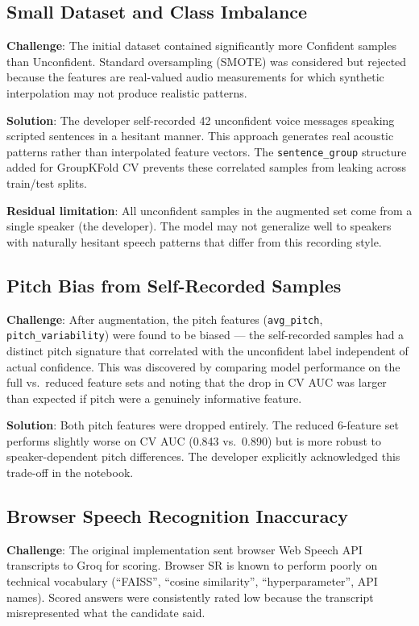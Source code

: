 \documentclass[12pt,a4paper]{article}
\begin{document}
\subsection{Small Dataset and Class Imbalance}

\textbf{Challenge}: The initial dataset contained significantly more Confident samples than Unconfident. Standard oversampling (SMOTE) was considered but rejected because the features are real-valued audio measurements for which synthetic interpolation may not produce realistic patterns.

\textbf{Solution}: The developer self-recorded 42 unconfident voice messages speaking scripted sentences in a hesitant manner. This approach generates real acoustic patterns rather than interpolated feature vectors. The \texttt{sentence\_group} structure added for GroupKFold CV prevents these correlated samples from leaking across train/test splits.

\textbf{Residual limitation}: All unconfident samples in the augmented set come from a single speaker (the developer). The model may not generalize well to speakers with naturally hesitant speech patterns that differ from this recording style.

\subsection{Pitch Bias from Self-Recorded Samples}

\textbf{Challenge}: After augmentation, the pitch features (\texttt{avg\_pitch}, \texttt{pitch\_variability}) were found to be biased --- the self-recorded samples had a distinct pitch signature that correlated with the unconfident label independent of actual confidence. This was discovered by comparing model performance on the full vs.\ reduced feature sets and noting that the drop in CV AUC was larger than expected if pitch were a genuinely informative feature.

\textbf{Solution}: Both pitch features were dropped entirely. The reduced 6-feature set performs slightly worse on CV AUC (0.843 vs.\ 0.890) but is more robust to speaker-dependent pitch differences. The developer explicitly acknowledged this trade-off in the notebook.

\subsection{Browser Speech Recognition Inaccuracy}

\textbf{Challenge}: The original implementation sent browser Web Speech API transcripts to Groq for scoring. Browser SR is known to perform poorly on technical vocabulary (``FAISS'', ``cosine similarity'', ``hyperparameter'', API names). Scored answers were consistently rated low because the transcript misrepresented what the candidate said.
\end{document}
